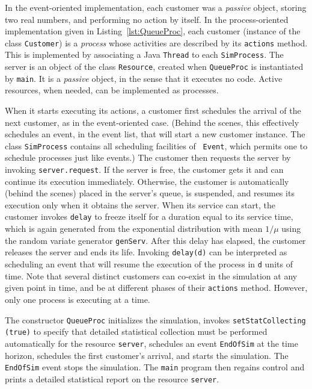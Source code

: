 In the event-oriented implementation, each customer was a {\em passive\/}
object, storing two real numbers, and performing no action by itself.
In the process-oriented implementation given in Listing~\ref{lst:QueueProc},
each customer (instance of the class \texttt{Customer}) is a
\emph{process} whose activities are described by its \texttt{actions} method.
This is implemented by associating a Java \texttt{Thread} to each
\texttt{SimProcess}.
The server is an object of the class \texttt{Resource}, created when
\texttt{QueueProc} is instantiated by \texttt{main}.
It is a {\em passive\/} object, in the sense that it executes no code.
Active resources, when needed, can be implemented as processes.

When it starts executing its actions, a customer first schedules
the arrival of the next customer, as in the event-oriented case.
(Behind the scenes, this effectively schedules an event, in the
event list, that will start a new customer instance.
The class \texttt{SimProcess} contains all scheduling facilities of {\tt
  Event}, which permits one
to schedule processes just like events.)
The customer then requests the server by invoking \texttt{server.request}.
If the server is free, the customer gets it and can continue its
execution immediately.  Otherwise, the customer is automatically
(behind the scenes) placed in the server's queue, is suspended,
and resumes its execution only when it obtains the server.
When its service can start, the customer invokes \texttt{delay} to
freeze itself for a duration equal to its service time, which is
again generated from the exponential distribution with mean $1/\mu$
using the random variate generator \texttt{genServ}.
After this delay has elapsed, the customer
releases the server and ends its life.
Invoking \texttt{delay(d)} can be interpreted as scheduling an event that
will resume the execution of the process in \texttt{d} units of time.
Note that several distinct customers can
co-exist in the simulation at any given point in time, and
be at different phases of their \texttt{actions} method.
However, only one process is executing at a time.

The constructor \texttt{QueueProc} initializes the simulation,
invokes \texttt{setStatCollecting (true)} to specify that detailed statistical
collection must be performed automatically for the resource \texttt{server},
schedules an event \texttt{EndOfSim} at the time horizon,
schedules the first customer's arrival, and starts the simulation.
The \texttt{EndOfSim} event stops the simulation.
The \texttt{main} program then regains control and prints a detailed
statistical report on the resource \texttt{server}.

